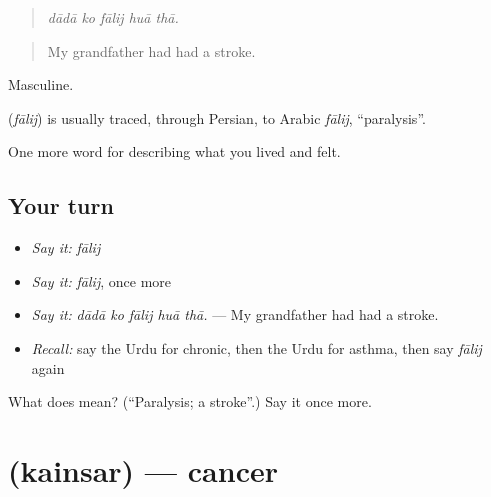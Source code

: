 \begin{quote}
    
\end{quote}

\begin{quote}
\emph{dādā ko fālij huā thā.}
\end{quote}

\begin{quote}
My grandfather had had a stroke.
\end{quote}

Masculine.

\begin{cousinweb}
\textbf{} (\emph{fālij}) is usually traced, through Persian, to Arabic \emph{fālij}, \textquotedblleft{}paralysis\textquotedblright{}.
\end{cousinweb}

\begin{grammarlens}[title={What you've built}]
One more word for describing what you lived and felt.
\end{grammarlens}

\subsection*{Your turn}
\begin{itemize}
\raggedright
  \item \emph{Say it:} \emph{fālij}
  \item \emph{Say it:} \emph{fālij}, once more
  \item \emph{Say it:} \emph{dādā ko fālij huā thā.} — My grandfather had had a stroke.
  \item \emph{Recall:} say the Urdu for chronic, then the Urdu for asthma, then say \emph{fālij} again
\end{itemize}

\begin{tcolorbox}[breakable,colback=teal!4,colframe=teal!35!black,title={Before you move on}]
What does  mean? (\textquotedblleft{}Paralysis; a stroke\textquotedblright{}.) Say it once more.
\end{tcolorbox}
\section[\texorpdfstring{\ur{کینسر} (kainsar)}{کینسر (kainsar)}]{ (kainsar) — cancer}

\label{lesson:UR-C475-kainsar}



